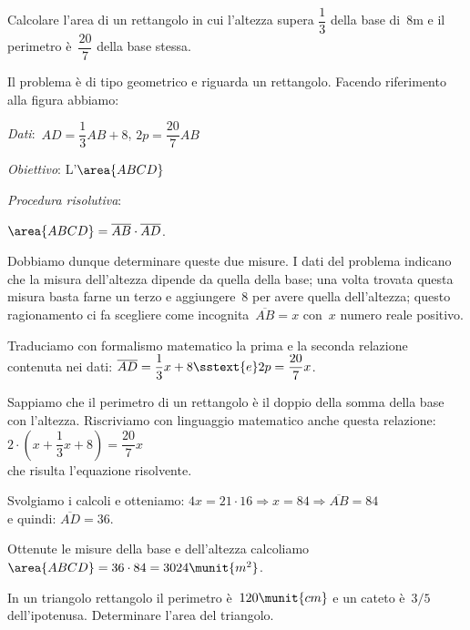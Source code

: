 \begin{problema}{}{}
Calcolare l'area di un rettangolo in cui
l'altezza supera \(\dfrac{1}{3}\) della base di~8m e il
perimetro è~\(\dfrac{20}{7}\) della base stessa.
\end{problema}

\begin{soluzione}{}{}
Il problema è di tipo geometrico e riguarda un rettangolo. Facendo riferimento 
alla figura abbiamo:
\begin{htmulticols}{2}
\emph{Dati}:~\(AD=\dfrac{1}{3}AB+8\), \quad \(2p=\dfrac{20}{7}AB\)

\emph{Obiettivo}: L'\(\area{ABCD}\)

\emph{Procedura risolutiva}:

\hspace{10mm}
\(\area{ABCD} = \overline{AB} \cdot \overline{AD}\).

{}
{}
\end{htmulticols}

Dobbiamo dunque determinare queste due misure. I dati del problema
indicano che la misura dell'altezza dipende da quella
della base; una volta trovata questa misura basta farne un terzo e
aggiungere~8 per avere quella dell'altezza; questo
ragionamento ci fa scegliere come incognita~\(\overline{AB}=x\)
con~\(x\) numero reale positivo.

Traduciamo con formalismo matematico la prima e la seconda relazione
contenuta nei dati:
\(\overline{AD}=\dfrac{1}{3}x+8\sstext{e} 2p=\dfrac{20}{7}x\).

Sappiamo che il perimetro di un rettangolo è il doppio della somma
della base con l'altezza. 
Riscriviamo con linguaggio matematico anche questa relazione:\\
\(2\cdot \left(x+\dfrac{1}{3}x+8\right)=\dfrac{20}{7}x\)\\
che risulta l'equazione risolvente.

Svolgiamo i calcoli e otteniamo: \quad 
\(4x=21\cdot 16\Rightarrow x=84\Rightarrow\overline{AB}=84\) \\
e quindi: \quad \(\overline{AD}=36\).

Ottenute le misure della base e dell'altezza calcoliamo 
\(\area{ABCD} = 36\cdot 84=3024\munit{{m}^{2}}\).
\end{soluzione}

\begin{problema}{}{}
In un triangolo rettangolo il perimetro è~\(120\munit{cm}\) e un cateto 
è~\(3/5\) dell'ipotenusa. Determinare l'area del triangolo.
\end{problema}

